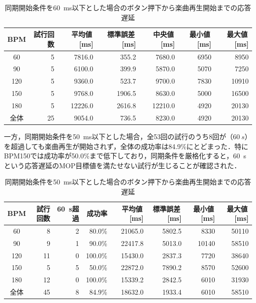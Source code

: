 \begin{table}[htbp]
    \centering
    \caption{同期開始条件を\SI{60}{ms}以下とした場合のボタン押下から楽曲再生開始までの応答遅延}
    \label{tab:song_start_60ms}
    \begin{tabular}{crrrrrr}
      \hline
      BPM & 試行回数 & 平均値\,[ms] & 標準誤差\,[ms] & 中央値\,[ms] & 最小値\,[ms] & 最大値\,[ms] \\
      \hline\hline
       60 & 5 &  7816.0 &  355.2 &  7680.0 &  6950 & 8950 \\
       90 & 5 &  6100.0 &  399.9 &  5870.0 &  5070 & 7250 \\
      120 & 5 &  9360.0 &  523.7 &  9700.0 &  7830 & 10910 \\
      150 & 5 &  9768.0 & 1906.5 &  8630.0 &  5000 & 16500 \\
      180 & 5 & 12226.0 & 2616.8 & 12210.0 &  4920 & 20130 \\
      \hline
      全体 & 25 & 9054.0 & 736.5 & 8230.0 & 4920 & 20130 \\
      \hline
    \end{tabular}
\end{table}

一方，同期開始条件を\SI{50}{ms}以下とした場合，全53回の試行のうち8回が（$\SI{60}{s}$）を超過しても楽曲再生が開始されず，全体の成功率は84.9\%にとどまった．特にBPM150では成功率が50.0\%まで低下しており，同期条件を厳格化すると，\SI{60}{s}という応答遅延のMOP目標値を満たせない試行が生じることが確認された．

\begin{table}[htbp]
    \centering
    \caption{同期開始条件を\SI{50}{ms}以下とした場合のボタン押下から楽曲再生開始までの応答遅延}
    \label{tab:song_start_50ms}
    \begin{tabular}{crrrrrrr}
      \hline
      BPM & 試行回数 & \SI{60}{s}超過 & 成功率 & 平均値\,[ms] & 標準誤差\,[ms] & 最小値\,[ms] & 最大値\,[ms] \\
      \hline\hline
       60 &  8 & 2 &  80.0\% & 21065.0 & 5802.5 &  8330 & 50110 \\
       90 &  9 & 1 &  90.0\% & 22417.8 & 5013.0 & 10140 & 58510 \\
      120 & 11 & 0 & 100.0\% & 15430.0 & 2837.3 &  7720 & 38640 \\
      150 &  5 & 5 &  50.0\% & 22872.0 & 7890.2 &  8570 & 52600 \\
      180 & 12 & 0 & 100.0\% & 15339.2 & 2842.5 &  6010 & 31930 \\
      \hline
      全体 & 45 & 8 &  84.9\% & 18632.0 & 1933.4 &  6010 & 58510 \\
      \hline
    \end{tabular}
\end{table}

